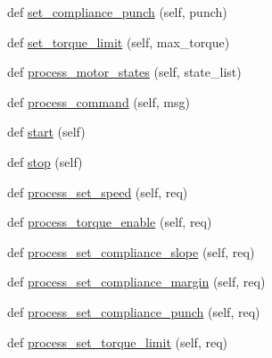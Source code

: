 \begin{DoxyCompactItemize}
\item 
def \hyperlink{classdynamixel__controllers_1_1joint__position__controller__dual__motor_1_1_joint_position_controller_dual_aa392ad24d93ec0bd5c45bd8248c4823c}{set\+\_\+compliance\+\_\+punch} (self, punch)
\item 
def \hyperlink{classdynamixel__controllers_1_1joint__position__controller__dual__motor_1_1_joint_position_controller_dual_a56380143862792ad3a6876de07d5b912}{set\+\_\+torque\+\_\+limit} (self, max\+\_\+torque)
\item 
def \hyperlink{classdynamixel__controllers_1_1joint__position__controller__dual__motor_1_1_joint_position_controller_dual_a698acc04b07a10f5d79e694d632daa46}{process\+\_\+motor\+\_\+states} (self, state\+\_\+list)
\item 
def \hyperlink{classdynamixel__controllers_1_1joint__position__controller__dual__motor_1_1_joint_position_controller_dual_a039ec66c11ba0c6942ccc0b28b2fc3cf}{process\+\_\+command} (self, msg)
\item 
def \hyperlink{classdynamixel__controllers_1_1joint__controller_1_1_joint_controller_a8da16a8b801f868a4de7c68d6adc851f}{start} (self)
\item 
def \hyperlink{classdynamixel__controllers_1_1joint__controller_1_1_joint_controller_a978da6ac850b0dd6a67ebe4a23f8fcdc}{stop} (self)
\item 
def \hyperlink{classdynamixel__controllers_1_1joint__controller_1_1_joint_controller_a97af096c1566307859ed168c900fa8a6}{process\+\_\+set\+\_\+speed} (self, req)
\item 
def \hyperlink{classdynamixel__controllers_1_1joint__controller_1_1_joint_controller_a2181fcf467234ed09e378a93ea5a0553}{process\+\_\+torque\+\_\+enable} (self, req)
\item 
def \hyperlink{classdynamixel__controllers_1_1joint__controller_1_1_joint_controller_a6390c0c20afc0581dd3b1122c894d175}{process\+\_\+set\+\_\+compliance\+\_\+slope} (self, req)
\item 
def \hyperlink{classdynamixel__controllers_1_1joint__controller_1_1_joint_controller_aed0bae387958b56f88fd707e9da9e8f1}{process\+\_\+set\+\_\+compliance\+\_\+margin} (self, req)
\item 
def \hyperlink{classdynamixel__controllers_1_1joint__controller_1_1_joint_controller_ac3d7aea8d47f24ab10c1162f34cce44f}{process\+\_\+set\+\_\+compliance\+\_\+punch} (self, req)
\item 
def \hyperlink{classdynamixel__controllers_1_1joint__controller_1_1_joint_controller_aa199ce6ae353ed44fe71ae96a5da242d}{process\+\_\+set\+\_\+torque\+\_\+limit} (self, req)

\end{DoxyCompactItemize}
